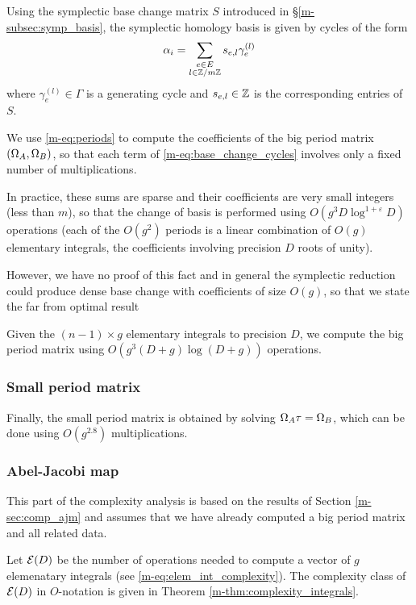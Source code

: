 \documentclass[main.tex]{subfiles}
\begin{document}
   Using the symplectic base change matrix $S$ introduced
   in \S \ref{m-subsec:symp_basis}, the symplectic homology basis is given
   by cycles of the form
   \begin{equation}
       \label{eq:base_change_cycles}
       \alpha_i = \sum_{\substack{e \in E \\ l\in\mathbb{Z}/m\mathbb{Z}}} s_{e,l}\gamma_e^{(l)}
   \end{equation}
   where $\gamma_e^{(l)} \in \Gamma$ is a generating cycle
   and $s_{e,l}\in\mathbb{Z}$ is the corresponding entries of $S$.

   We use \eqref{m-eq:periods} to compute the coefficients of the big period
   matrix $(\Omega_A,\Omega_B)$, so that each term of \eqref{m-eq:base_change_cycles}
   involves only a fixed number of multiplications.

   In practice, these sums are sparse and their coefficients are very small integers
   (less than $m$), so that the change of basis is performed using
   $O(g^3D\log^{1+\varepsilon}D)$ operations
   (each of the $O(g^2)$ periods is a linear combination of $O(g)$ elementary integrals,
   the coefficients involving precision $D$ roots of unity).

   However, we have no proof of this fact and in general the symplectic reduction
   could produce dense base change with coefficients of size $O(g)$,
   so that we state the far from optimal result
   \begin{thm}
       Given the $(n-1)\times g$ elementary integrals to precision $D$,
       we compute the big period matrix using $O(g^3(D+g)\log(D+g))$ operations.
   \end{thm}

   \subsubsection{Small period matrix}

   Finally, the small period matrix is obtained by solving $\Omega_A\tau=\Omega_B$,
   which can be done using $O(g^{2.8})$ multiplications.

   \subsubsection{Abel-Jacobi map}

  This part of the complexity analysis is based on the results of Section \ref{m-sec:comp_ajm} and assumes that we have already computed a big period matrix and all related data.

  Let $\mathcal E(D)$ be the number of operations needed to compute a vector of $g$ elemenatary integrals  (see \eqref{m-eq:elem_int_complexity}). The complexity class of $\mathcal E(D)$ in $O$-notation is given in
  Theorem \ref{m-thm:complexity_integrals}.
\end{document}
